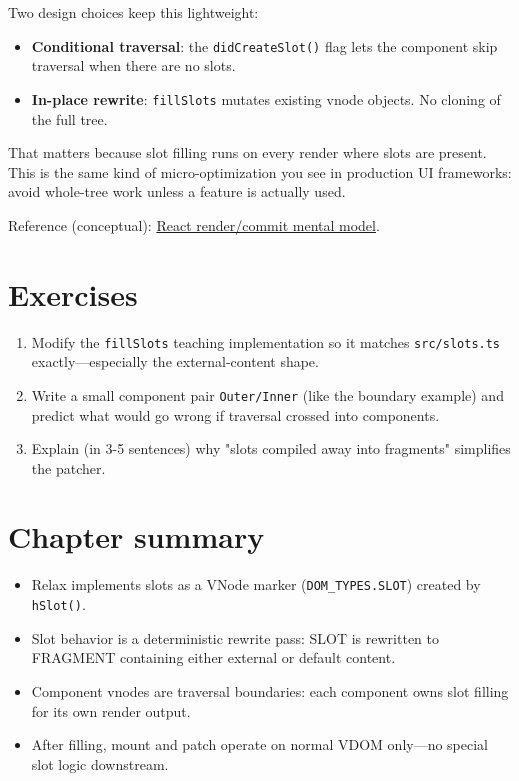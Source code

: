 Two design choices keep this lightweight:

\begin{itemize}
  \item \textbf{Conditional traversal}: the \texttt{didCreateSlot()} flag lets the component skip traversal when there are no slots.
  \item \textbf{In-place rewrite}: \texttt{fillSlots} mutates existing vnode objects. No cloning of the full tree.
\end{itemize}

That matters because slot filling runs on every render where slots are present.
This is the same kind of micro-optimization you see in production UI frameworks: avoid whole-tree work unless a feature is actually used.

Reference (conceptual): \href{https://react.dev/learn/render-and-commit}{React render/commit mental model}.

\section{Exercises}

\begin{enumerate}
  \item Modify the \texttt{fillSlots} teaching implementation so it matches \texttt{src/slots.ts} exactly---especially the external-content shape.
  \item Write a small component pair \texttt{Outer/Inner} (like the boundary example) and predict what would go wrong if traversal crossed into components.
  \item Explain (in 3-5 sentences) why "slots compiled away into fragments" simplifies the patcher.
\end{enumerate}

\section{Chapter summary}

\begin{itemize}
  \item Relax implements slots as a VNode marker (\texttt{DOM\_TYPES.SLOT}) created by \texttt{hSlot()}.
  \item Slot behavior is a deterministic rewrite pass: SLOT is rewritten to FRAGMENT containing either external or default content.
  \item Component vnodes are traversal boundaries: each component owns slot filling for its own render output.
  \item After filling, mount and patch operate on normal VDOM only---no special slot logic downstream.
\end{itemize}
